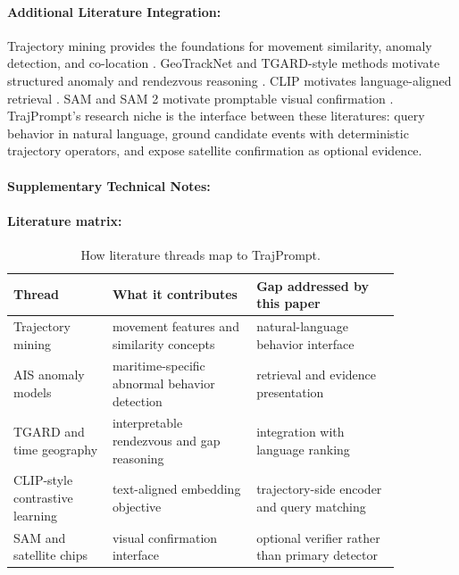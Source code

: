 \documentclass{article}
\begin{document}
\paragraph{Additional Literature Integration:}

Trajectory mining provides the foundations for movement similarity, anomaly detection, and co-location \citep{zheng2015trajectory,pallotta2013vessel}. GeoTrackNet and TGARD-style methods motivate structured anomaly and rendezvous reasoning \citep{nguyen2020geotracknet,sharma2022tist}. CLIP motivates language-aligned retrieval \citep{radford2021learning}. SAM and SAM 2 motivate promptable visual confirmation \citep{kirillov2023segment,ravi2024sam2}. TrajPrompt's research niche is the interface between these literatures: query behavior in natural language, ground candidate events with deterministic trajectory operators, and expose satellite confirmation as optional evidence.

\paragraph{Supplementary Technical Notes:}

\paragraph{Literature matrix:}

\begin{table}[t]
\centering
\caption{How literature threads map to TrajPrompt.}
\begin{tabular}{@{}p{0.22\linewidth}p{0.32\linewidth}p{0.32\linewidth}@{}}
\toprule
\textbf{Thread} & \textbf{What it contributes} & \textbf{Gap addressed by this paper}\\
\midrule
Trajectory mining & movement features and similarity concepts & natural-language behavior interface\\
AIS anomaly models & maritime-specific abnormal behavior detection & retrieval and evidence presentation\\
TGARD and time geography & interpretable rendezvous and gap reasoning & integration with language ranking\\
CLIP-style contrastive learning & text-aligned embedding objective & trajectory-side encoder and query matching\\
SAM and satellite chips & visual confirmation interface & optional verifier rather than primary detector\\
\bottomrule
\end{tabular}
\end{table}
\end{document}
